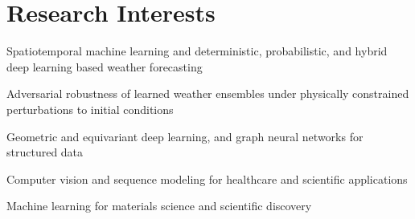 \documentclass[11pt,a4paper]{article}
\begin{document}
\section*{Research Interests}
\begin{cvlist}
  \item Spatiotemporal machine learning and deterministic, probabilistic, and hybrid deep learning based weather forecasting
  \item Adversarial robustness of learned weather ensembles under physically constrained perturbations to initial conditions
  \item Geometric and equivariant deep learning, and graph neural networks for structured data
  \item Computer vision and sequence modeling for healthcare and scientific applications
  \item Machine learning for materials science and scientific discovery
\end{cvlist}
\end{document}
